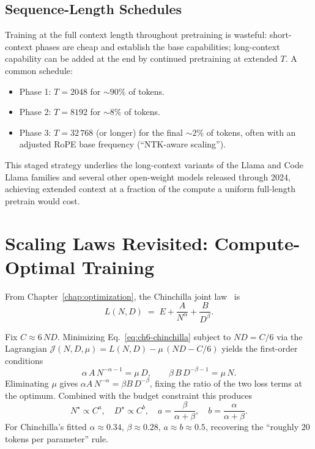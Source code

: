 \subsection{Sequence-Length Schedules}

Training at the full context length throughout pretraining is
wasteful: short-context phases are cheap and establish the base
capabilities; long-context capability can be added at the end by
continued pretraining at extended $T$. A common schedule:
\begin{itemize}
  \item Phase 1: $T = 2048$ for $\sim\!90\%$ of tokens.
  \item Phase 2: $T = 8192$ for $\sim\!8\%$ of tokens.
  \item Phase 3: $T = 32\,768$ (or longer) for the final $\sim\!2\%$
        of tokens, often with an adjusted RoPE base frequency
        (``NTK-aware scaling'').
\end{itemize}
This staged strategy underlies the long-context variants of the
Llama and Code Llama families and several other open-weight models
released through 2024, achieving extended context at a fraction of
the compute a uniform full-length pretrain would cost.

\section{Scaling Laws Revisited: Compute-Optimal Training}

From Chapter~\ref{chap:optimization}, the Chinchilla joint law~\citep{hoffmann2022chinchilla}
is
\begin{equation}
\label{eq:ch6-chinchilla}
L(N, D) \;=\; E + \frac{A}{N^\alpha} + \frac{B}{D^\beta}.
\end{equation}

\begin{derivation}
Fix $C \approx 6\,N D$. Minimizing Eq.~\eqref{eq:ch6-chinchilla}
subject to $N D = C/6$ via the Lagrangian
$\mathcal{J}(N, D, \mu) = L(N, D) - \mu\,(N D - C/6)$ yields the
first-order conditions
\[
\alpha\,A\,N^{-\alpha-1} = \mu\,D,
\qquad
\beta\,B\,D^{-\beta-1} = \mu\,N.
\]
Eliminating $\mu$ gives
$\alpha A\,N^{-\alpha} = \beta B\,D^{-\beta}$, fixing the ratio of the
two loss terms at the optimum. Combined with the budget constraint
this produces
\[
N^\star \propto C^{a},
\quad
D^\star \propto C^{b},
\quad
a = \frac{\beta}{\alpha + \beta},
\quad
b = \frac{\alpha}{\alpha + \beta}.
\]
For Chinchilla's fitted $\alpha \approx 0.34$, $\beta \approx 0.28$,
$a \approx b \approx 0.5$, recovering the
``roughly 20 tokens per parameter'' rule.
\end{derivation}

